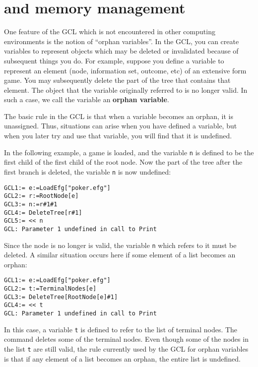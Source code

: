 \section{ and memory management}

One feature of the GCL which is not encountered in other computing
environments is the notion of ``orphan variables''.  In the GCL, you
can create variables to represent objects which may be deleted or
invalidated because of subsequent things you do. For example, suppose
you define a variable to represent an element (node, information set,
outcome, etc) of an extensive form game.  You may subsequently delete
the part of the tree that contains that element.  The object that the
variable originally referred to is no longer valid.  In such a case,
we call the variable an {\bf orphan variable}.

The basic rule in the GCL is that when a variable becomes an orphan,
it is unassigned.  Thus, situations can arise when you have defined a
variable, but when you later try and use that variable, you will find
that it is undefined.  

In the following example, a game is loaded, and the variable \verb+n+
is defined to be the first child of the first child of the root node.
Now the part of the tree after the first branch is deleted, the
variable \verb+n+ is now undefined:

\begin{verbatim}
GCL1:= e:=LoadEfg["poker.efg"]
GCL2:= r:=RootNode[e]
GCL3:= n:=r#1#1
GCL4:= DeleteTree[r#1]
GCL5:= << n
GCL: Parameter 1 undefined in call to Print
\end{verbatim}

\noindent
Since the node is no longer is valid, the variable \verb+n+ which
refers to it must be deleted.  A similar situation occurs here if some
element of a list becomes an orphan:

\begin{verbatim}
GCL1:= e:=LoadEfg["poker.efg"]
GCL2:= t:=TerminalNodes[e]
GCL3:= DeleteTree[RootNode[e]#1]
GCL4:= << t
GCL: Parameter 1 undefined in call to Print
\end{verbatim}

In this case, a variable \verb+t+ is defined to refer to the list of
terminal nodes.  The  command deletes some of the
terminal nodes.  Even though some of the nodes in the list \verb+t+
are still valid, the rule currently used by the GCL for orphan
variables is that if any element of a list becomes an orphan, the
entire list is undefined.  

